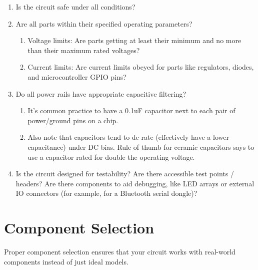 \documentclass{article}
\begin{document}
\begin{enumerate}
  \item Is the circuit safe under all conditions?
  \item Are all parts within their specified operating parameters?
  \begin{enumerate}
    \item Voltage limits: Are parts getting at least their minimum and no more than their maximum rated voltages?
    \item Current limits: Are current limits obeyed for parts like regulators, diodes, and microcontroller GPIO pins?
  \end{enumerate}
  \item Do all power rails have appropriate capacitive filtering?
  \begin{enumerate}
    \item It's common practice to have a 0.1uF capacitor next to each pair of power/ground pins on a chip.
    \item Also note that capacitors tend to de-rate (effectively have a lower capacitance) under DC bias. Rule of thumb for ceramic capacitors says to use a capacitor rated for double the operating voltage.
  \end{enumerate}
  \item Is the circuit designed for testability? Are there accessible test points / headers? Are there components to aid debugging, like LED arrays or external IO connectors (for example, for a Bluetooth serial dongle)?
\end{enumerate}

\section{Component Selection}
Proper component selection ensures that your circuit works with real-world components instead of just ideal models.
\end{document}
